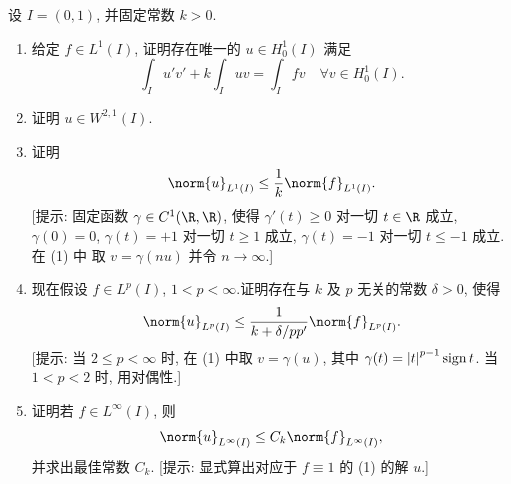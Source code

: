 \begin{exercise}
\label{exer:8.23}
设 $I=(0,1)$, 并固定常数 $k>0$.
\begin{enumerate}[label=\arabic*., leftmargin=2.2em, itemsep=0.3em]
	\item 给定 $f\in L^1(I)$, 证明存在唯一的 $u\in H_0^1(I)$ 满足
	      \begin{equation}
	      \int_Iu'v'+k\int_Iuv=\int_Ifv\quad\forall v\in H_0^1(I).
	      \tag{1}
	      \end{equation}
	\item 证明 $u\in W^{2,1}(I)$.
	\item 证明
	      \begin{equation*}
	      \norm{u}_{L^1(I)}\le\frac1k\norm{f}_{L^1(I)}.
	      \end{equation*}
	      [提示: 固定函数 $\gamma\in C^1(\R,\R)$, 使得 $\gamma'(t)\ge0$
	      对一切 $t\in\R$ 成立, $\gamma(0)=0$, $\gamma(t)=+1$ 对一切
	      $t\ge1$ 成立, $\gamma(t)=-1$ 对一切 $t\le-1$ 成立.在 (1) 中
	      取 $v=\gamma(nu)$ 并令 $n\to\infty$.]
	\item 现在假设 $f\in L^p(I)$, $1<p<\infty$.证明存在与 $k$ 及 $p$
	      无关的常数 $\delta>0$, 使得
	      \begin{equation*}
	      \norm{u}_{L^p(I)}\le\frac{1}{k+\delta/pp'}\norm{f}_{L^p(I)}.
	      \end{equation*}
	      [提示: 当 $2\le p<\infty$ 时, 在 (1) 中取
	      $v=\gamma(u)$, 其中 $\gamma(t)=\left|t\right|^{p-1}\operatorname{sign}t$.
	      当 $1<p<2$ 时, 用对偶性.]
	\item 证明若 $f\in L^\infty(I)$, 则
	      \begin{equation*}
	      \norm{u}_{L^\infty(I)}\le C_k\norm{f}_{L^\infty(I)},
	      \end{equation*}
	      并求出最佳常数 $C_k$.
	      [提示: 显式算出对应于 $f\equiv1$ 的 (1) 的解 $u$.]
\end{enumerate}
\end{exercise}

